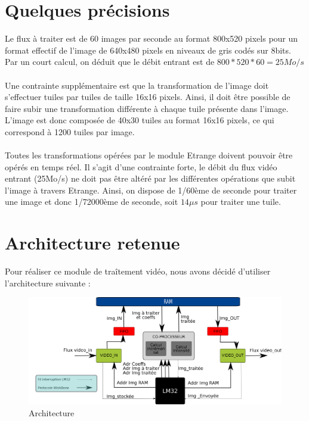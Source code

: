 \documentclass[a4paper,12pt]{report}
\begin{document}
{  \section{Quelques précisions}
             {
               Le flux à traiter est de 60 images par seconde au format 800x520 pixels pour un format effectif de l'image de 640x480 pixels en niveaux de gris codés sur 8bits. Par un court calcul, on déduit que le débit entrant est de $800*520*60 = 25 Mo/s$
\\
\\
Une contrainte supplémentaire est que la transformation de l'image doit s'effectuer tuiles par tuiles de taille 16x16 pixels. Ainsi, il doit être possible de faire subir une transformation différente à chaque tuile présente dans l'image. L'image est donc composée de 40x30 tuiles au format 16x16 pixels, ce qui correspond à 1200 tuiles par image.
\\
\\
Toutes les transformations opérées par le module Etrange doivent pouvoir être opérés en temps réel. Il s'agit d'une contrainte forte, le débit du flux vidéo entrant (25Mo/s) ne doit pas être altéré par les différentes opérations que subit l'image à travers Etrange.
               Ainsi, on dispose de 1/60ème de seconde pour traiter une image et donc 1/72000ème de seconde, soit $14 \mu s$ pour traiter une tuile.

	       \section{Architecture retenue}
                               {Pour réaliser ce module de traîtement vidéo, nous avons décidé d'utiliser l'architecture suivante :

                                 \begin{figure}[!h]
	                           \centering
	                           \includegraphics[scale = 0.1]{hardware-arch.png}
	                           \caption{Architecture}
                                 \end{figure}

}}}
\end{document}
